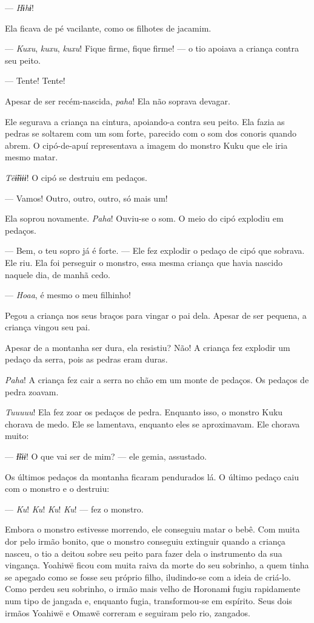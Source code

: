 --- \textit{Hɨhɨ}! 

Ela ficava de pé vacilante, como os filhotes de jacamim. 

--- \textit{Kuxu}, \textit{kuxu}, \textit{kuxu}! Fique firme, fique firme! --- o tio apoiava a
criança contra seu peito. 

--- Tente! Tente! 

Apesar de ser recém-nascida, \textit{paha}! Ela não soprava devagar. 
   
Ele segurava a criança na cintura, apoiando-a contra seu peito. Ela 
fazia as pedras se soltarem com um som forte, parecido com o som dos
conoris quando abrem. O cipó-de-apuí representava a imagem do monstro
Kuku que ele iria mesmo matar. 

\textit{Tëɨ̃ɨɨɨɨ}! O cipó se destruiu em pedaços. 

--- Vamos! Outro, outro, outro, só mais um!

Ela soprou novamente. \textit{Paha}! Ouviu-se o som. O meio do cipó explodiu em pedaços. 

--- Bem, o teu sopro já é forte. --- Ele fez explodir o pedaço de cipó
que sobrava. Ele riu. Ela foi perseguir o monstro, essa mesma criança
que havia nascido naquele dia, de manhã cedo. 

--- \textit{Hoaa}, é mesmo o meu filhinho! 

Pegou a criança nos seus braços para vingar o pai dela. Apesar de ser
pequena, a criança vingou seu pai. 

Apesar de a montanha ser dura, ela resistiu? Não! A criança fez explodir um
pedaço da serra, pois as pedras eram duras. 

\textit{Paha}! A criança fez cair a serra no chão em um monte de pedaços. Os
pedaços de pedra zoavam.

\textit{Tuuuuu}! Ela fez zoar os pedaços de pedra. Enquanto isso, o monstro Kuku
chorava de medo. Ele se lamentava, enquanto eles se aproximavam. Ele
chorava muito:

--- \textit{Ɨ̃ɨɨɨ}! O que vai ser de mim? --- ele gemia, assustado. 

Os últimos pedaços da montanha ficaram pendurados lá. O último pedaço
caiu com o monstro e o destruiu: 

--- \textit{Ku}! \textit{Ku}! \textit{Ku}! \textit{Ku}! --- fez o monstro. 

Embora o monstro estivesse morrendo, ele conseguiu matar o bebê. Com
muita dor pelo irmão bonito, que o monstro conseguiu extinguir quando a
criança nasceu, o tio a deitou sobre seu peito para fazer dela o
instrumento da sua vingança. Yoahiwë ficou com muita raiva da morte do
seu sobrinho, a quem tinha se apegado como se fosse seu próprio filho,
iludindo-se com a ideia de criá-lo. Como perdeu seu sobrinho, o irmão
mais velho de Horonamɨ fugiu rapidamente num tipo de jangada e, enquanto
fugia, transformou-se em espírito. Seus dois irmãos Yoahiwë e Omawë correram e seguiram pelo rio, zangados. 

